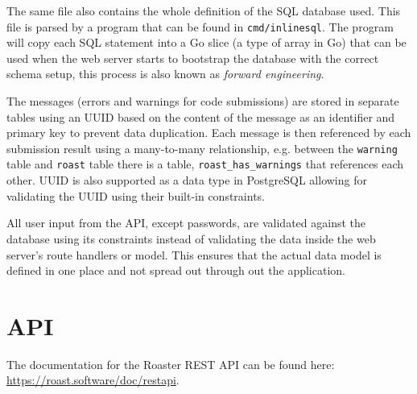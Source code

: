 \documentclass[12pt,a4paper]{report}
\begin{document}
The same file also contains the whole definition of the SQL database used. This file is parsed by a program that can be found in \texttt{cmd/inlinesql}\cite{https://github.com/LuleaUniversityOfTechnology/2018-project-roaster/blob/master/cmd/inlinesql/main.go}. The program will copy each SQL statement into a Go slice (a type of array in Go) that can be used when the web server starts to bootstrap the database with the correct schema setup, this process is also known as \textit{forward engineering}.

The messages (errors and warnings for code submissions) are stored in separate tables using an UUID based on the content of the message as an identifier and primary key to prevent data duplication. Each message is then referenced by each submission result using a many-to-many relationship, e.g. between the \texttt{warning} table and \texttt{roast} table there is a table, \texttt{roast\_has\_warnings} that references each other. UUID is also supported as a data type in PostgreSQL\cite{pg-uuid} allowing for validating the UUID using their built-in constraints.

All user input from the API, except passwords, are validated against the database using its constraints instead of validating the data inside the web server's route handlers or model. This ensures that the actual data model is defined in one place and not spread out through out the application.

\section{API}
\label{sec:api-design}
The documentation for the Roaster REST API can be found here: \\ \url{https://roast.software/doc/restapi}.
\end{document}
